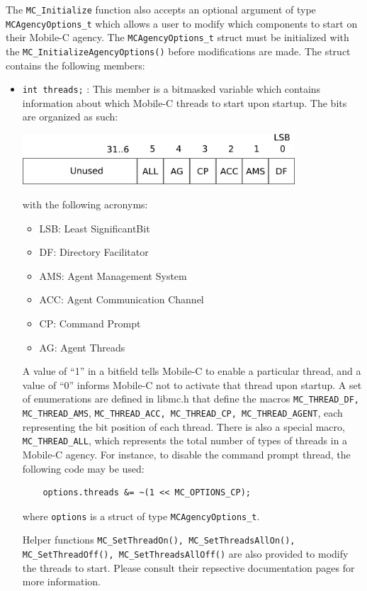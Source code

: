 The \texttt{MC\_Initialize} function also accepts an optional argument of type
\texttt{MCAgencyOptions\_t} which allows a user to modify which components to
start on their Mobile-C agency. The \texttt{MCAgencyOptions\_t} struct must be initialized with the 
\texttt{MC\_InitializeAgencyOptions()} before modifications are made. The struct contains the following
members:
\begin{itemize}
  \item \texttt{int threads;} : This member is a bitmasked variable which contains information
  about which Mobile-C threads to start upon startup. The bits are organized as such:

  \includegraphics[width=4in]{figure/mobilec_threads_bitfields.png} 
  
  with the following acronyms:
    \begin{itemize}
      \item LSB: Least SignificantBit
      \item DF: Directory Facilitator
      \item AMS: Agent Management System
      \item ACC: Agent Communication Channel
      \item CP: Command Prompt
      \item AG: Agent Threads
    \end{itemize}
    A value of ``1'' in a bitfield tells Mobile-C to enable a particular thread,
    and a value of ``0'' informs Mobile-C not to activate that thread upon
    startup. A set of enumerations are defined in libmc.h that define the macros 
    \texttt{MC\_THREAD\_DF, MC\_THREAD\_AMS}, \texttt{MC\_THREAD\_ACC, MC\_THREAD\_CP, MC\_THREAD\_AGENT},
    each representing the bit position of each thread. There is also a 
    special macro, \texttt{MC\_THREAD\_ALL}, which represents the total number of 
    types of threads in a Mobile-C agency. For instance, to disable
    the command prompt thread, the following code may be used:
    \begin{verbatim}
    options.threads &= ~(1 << MC_OPTIONS_CP);
    \end{verbatim}
    where \texttt{options} is a struct of type \texttt{MCAgencyOptions\_t}.

    Helper functions \texttt{MC\_SetThreadOn(), MC\_SetThreadsAllOn(),
    MC\_SetThreadOff(), MC\_SetThreadsAllOff()} are also provided to modify the
    threads to start. Please consult their repsective documentation pages for
    more information.


\end{itemize}
